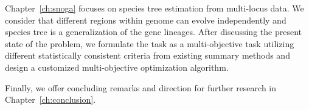 Chapter~\ref{ch:snoga} focuses on species tree estimation from multi-locus data. We consider that different regions within genome can evolve independently and species tree is a generalization of the gene lineages. After discussing the present state of the problem, we formulate the task as a multi-objective task utilizing different statistically consistent criteria from existing summary methods and design a customized multi-objective optimization algorithm.


Finally, we offer concluding remarks and direction for further research in Chapter~\ref{ch:conclusion}.
